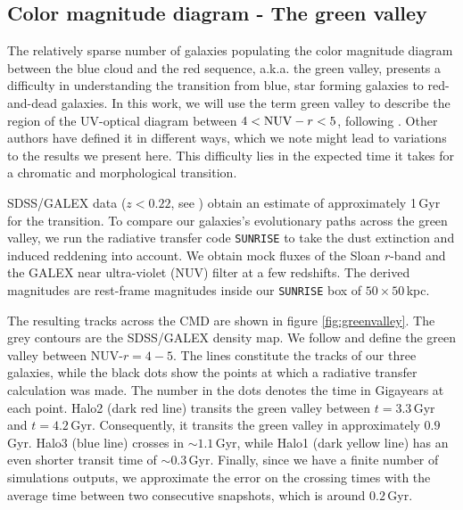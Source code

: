 \documentclass[useAMS,usenatbib]{mnras}
\begin{document}
\subsection{Color magnitude diagram - The green valley}
\label{sec:cmd}

The relatively sparse number of galaxies populating the color
magnitude diagram between the blue cloud and the red sequence,
a.k.a. the green valley, presents a difficulty in understanding the
transition from blue, star forming galaxies to red-and-dead
galaxies. {In this
  work, we will use the term green valley to describe the region of
  the UV-optical diagram between $4<{\rm NUV}-r<5$, following
  \citet{Salim2014}. Other authors have defined it in different ways,
  which we note might lead to variations to the results we present here.} This difficulty lies in the expected time it takes for a
chromatic and morphological transition. 

SDSS/GALEX data ($z<0.22$, see
  \citealt{Salim2007}) obtain an estimate of approximately 1\,Gyr for
the transition. To compare our galaxies's evolutionary paths across
the green valley, we run the radiative transfer code \texttt{SUNRISE}
to take the dust extinction and induced reddening into account. We obtain mock fluxes
of the Sloan $r$-band and the GALEX near ultra-violet (NUV) filter at a
few redshifts. {The derived magnitudes are rest-frame
  magnitudes inside our \texttt{SUNRISE} box of $50\times50$\,kpc.}

The resulting tracks across the CMD are shown in figure
\ref{fig:greenvalley}. The grey contours are the SDSS/GALEX density
map. We follow \citet{Salim2014} and define the green valley between
NUV-$r=4-5$. The lines constitute the tracks of our three galaxies,
while the black dots show the points at which a radiative transfer
calculation was made. The number in the dots denotes the time in
Gigayears at each point. Halo2 (dark red line) transits the green
valley between $t=3.3$\,Gyr and $t=4.2$\,Gyr. Consequently, it
transits the green valley in approximately $0.9$\,Gyr. Halo3 (blue
line) crosses in $\sim1.1$\,Gyr, while Halo1 (dark yellow line) has
an even shorter transit time of $\sim0.3$\,Gyr.  Finally, since we have a finite
number of simulations outputs, we approximate the error on the crossing times with the average time
between two consecutive snapshots, which is around $0.2$\,Gyr. 
\end{document}
